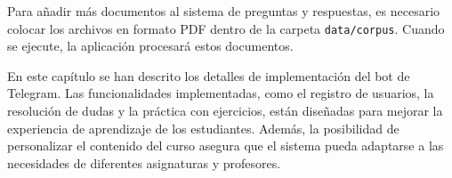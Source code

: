 Para añadir más documentos al sistema de preguntas y respuestas, es necesario colocar los archivos en formato PDF dentro de la carpeta \texttt{data/corpus}. Cuando se ejecute, la aplicación procesará estos documentos.

En este capítulo se han descrito los detalles de implementación del bot de Telegram. Las funcionalidades implementadas, como el registro de usuarios, la resolución de dudas y la práctica con ejercicios, están diseñadas para mejorar la experiencia de aprendizaje de los estudiantes. Además, la posibilidad de personalizar el contenido del curso asegura que el sistema pueda adaptarse a las necesidades de diferentes asignaturas y profesores.